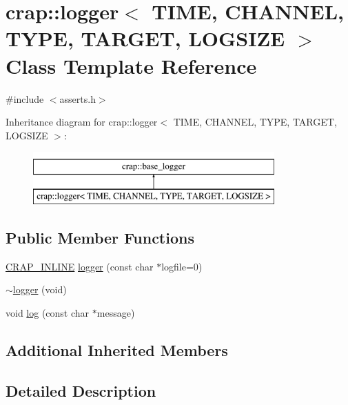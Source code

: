 \hypertarget{singletoncrap_1_1logger}{\section{crap\+:\+:logger$<$ T\+I\+M\+E, C\+H\+A\+N\+N\+E\+L, T\+Y\+P\+E, T\+A\+R\+G\+E\+T, L\+O\+G\+S\+I\+Z\+E $>$ Class Template Reference}
\label{singletoncrap_1_1logger}
}


{\ttfamily \#include $<$asserts.\+h$>$}

Inheritance diagram for crap\+:\+:logger$<$ T\+I\+M\+E, C\+H\+A\+N\+N\+E\+L, T\+Y\+P\+E, T\+A\+R\+G\+E\+T, L\+O\+G\+S\+I\+Z\+E $>$\+:\begin{figure}[H]
\begin{center}
\leavevmode
\includegraphics[height=2.000000cm]{singletoncrap_1_1logger}
\end{center}
\end{figure}
\subsection*{Public Member Functions}
\begin{DoxyCompactItemize}
\item 
\hyperlink{config__x86_8h_a5a40526b8d842e7ff731509998bb0f1c}{C\+R\+A\+P\+\_\+\+I\+N\+L\+I\+N\+E} \hyperlink{singletoncrap_1_1logger_a8b9496b51fe6c663cf8ae93c8b5aadbd}{logger} (const char $\ast$logfile=0)
\item 
\hyperlink{singletoncrap_1_1logger_a1d22a50f852b80fbfb466b2226303277}{$\sim$logger} (void)
\item 
void \hyperlink{singletoncrap_1_1logger_a63f7fa062e702eda3f9c974753980f7a}{log} (const char $\ast$message)
\end{DoxyCompactItemize}
\subsection*{Additional Inherited Members}


\subsection{Detailed Description}
